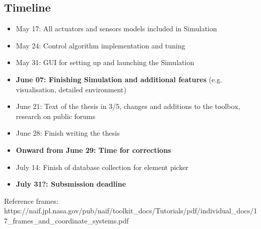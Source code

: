 \subsection*{Timeline}
\begin{itemize}
    \item May 17: All actuators and sensors models included in Simulation
    \item May 24: Control algorithm implementation and tuning
    \item May 31: GUI for setting up and launching the Simulation
    \item \textbf{June 07: Finishing Simulation and additional features} (e.g. visualisation, detailed environment)
    \item June 21: Text of the thesis in 3/5, changes and additions to the toolbox, research on public forums
    \item June 28: Finish writing the thesis
    \item \textbf{Onward from June 29: Time for corrections}
    \item July 14: Finish of database collection for element picker
    \item \textbf{July 31?: Subsmission deadline}
\end{itemize}


Reference frames:
https://naif.jpl.nasa.gov/pub/naif/toolkit_docs/Tutorials/pdf/individual_docs/17_frames_and_coordinate_systems.pdf

